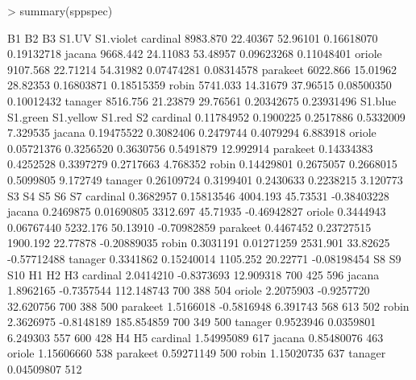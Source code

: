 \documentclass{article}
\begin{document}
\begin{Schunk}
\begin{Sinput}
> summary(sppspec)
\end{Sinput}
\begin{Soutput}
               B1       B2       B3      S1.UV  S1.violet
cardinal 8983.870 22.40367 52.96101 0.16618070 0.19132718
jacana   9668.442 24.11083 53.48957 0.09623268 0.11048401
oriole   9107.568 22.71214 54.31982 0.07474281 0.08314578
parakeet 6022.866 15.01962 28.82353 0.16803871 0.18515359
robin    5741.033 14.31679 37.96515 0.08500350 0.10012432
tanager  8516.756 21.23879 29.76561 0.20342675 0.23931496
            S1.blue  S1.green S1.yellow    S1.red        S2
cardinal 0.11784952 0.1900225 0.2517886 0.5332009  7.329535
jacana   0.19475522 0.3082406 0.2479744 0.4079294  6.883918
oriole   0.05721376 0.3256520 0.3630756 0.5491879 12.992914
parakeet 0.14334383 0.4252528 0.3397279 0.2717663  4.768352
robin    0.14429801 0.2675057 0.2668015 0.5099805  9.172749
tanager  0.26109724 0.3199401 0.2430633 0.2238215  3.120773
                S3         S4       S5       S6          S7
cardinal 0.3682957 0.15813546 4004.193 45.73531 -0.38403228
jacana   0.2469875 0.01690805 3312.697 45.71935 -0.46942827
oriole   0.3444943 0.06767440 5232.176 50.13910 -0.70982859
parakeet 0.4467452 0.23727515 1900.192 22.77878 -0.20889035
robin    0.3031191 0.01271259 2531.901 33.82625 -0.57712488
tanager  0.3341862 0.15240014 1105.252 20.22771 -0.08198454
                S8         S9        S10  H1  H2  H3
cardinal 2.0414210 -0.8373693  12.909318 700 425 596
jacana   1.8962165 -0.7357544 112.148743 700 388 504
oriole   2.2075903 -0.9257720  32.620756 700 388 500
parakeet 1.5166018 -0.5816948   6.391743 568 613 502
robin    2.3626975 -0.8148189 185.854859 700 349 500
tanager  0.9523946  0.0359801   6.249303 557 600 428
                 H4  H5
cardinal 1.54995089 617
jacana   0.85480076 463
oriole   1.15606660 538
parakeet 0.59271149 500
robin    1.15020735 637
tanager  0.04509807 512
\end{Soutput}
\end{Schunk}
\end{document}
